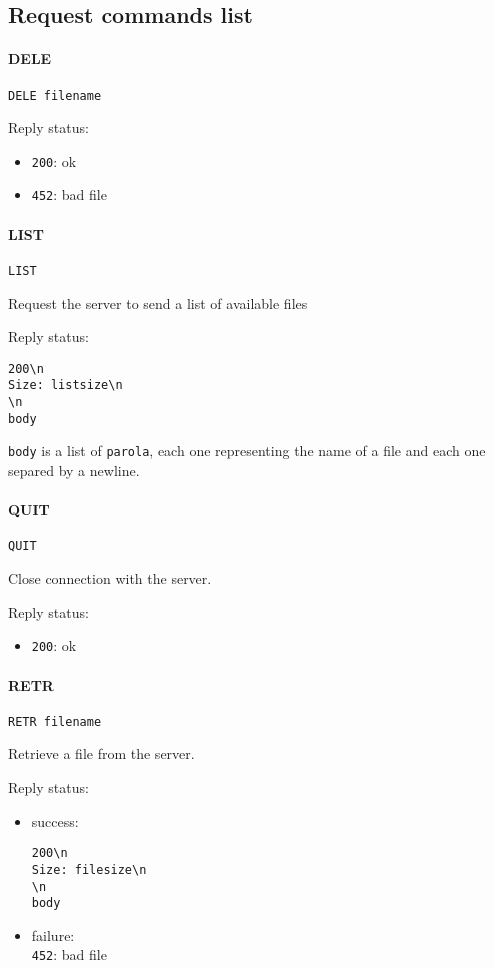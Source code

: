 \documentclass[a4paper,12pt]{article}
\begin{document}
\subsection{Request commands list}

\paragraph{DELE}
\texttt{DELE filename}

Reply status:
\begin{itemize}
  \item \texttt{200}: ok
  \item \texttt{452}: bad file
\end{itemize}

\paragraph{LIST}
\texttt{LIST}

Request the server to send a list of available files

Reply status:
\begin{verbatim}
200\n
Size: listsize\n
\n
body
\end{verbatim}

\texttt{body} is a list of \texttt{parola}, each one representing the name of a file and each one separed by a newline.

\paragraph{QUIT}
\texttt{QUIT}

Close connection with the server.

Reply status:
\begin{itemize}
  \item \texttt{200}: ok
\end{itemize}

\paragraph{RETR}
\texttt{RETR filename}

Retrieve a file from the server.

Reply status:
\begin{itemize}
  \item success:
\begin{verbatim}
200\n
Size: filesize\n
\n
body
\end{verbatim}
  \item failure:\\
  \texttt{452}: bad file
\end{itemize}
\end{document}
